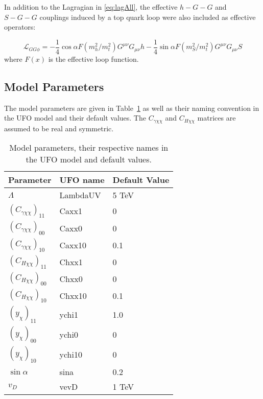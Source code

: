 \documentclass[a4paper,11pt]{article}
\begin{document}
In addition to the Lagragian in \cref{eq:lagAll}, the effective $h-G-G$ and $S-G-G$ couplings induced by a top quark loop were also included as effective operators:

\begin{equation*}
	\mathcal{L}_{GG\phi} = -\frac{1}{4} \cos\alpha F(m_h^2/m_t^2) G^{\mu\nu} G_{\mu\nu} h -\frac{1}{4} \sin\alpha F(m_S^2/m_t^2) G^{\mu\nu} G_{\mu\nu} S
\end{equation*}
where $F(x)$ is the effective loop function.
\subsection*{Model Parameters}

The model parameters are given in Table~\cref{tab:parameters} as well as their naming convention in the UFO model and their default values. The $C_{\gamma \chi\chi}$ and $C_{H \chi\chi}$ matrices are assumed to be real and symmetric.


\begin{table}[h!]   \centering
	\vspace{0.2cm}
	\caption{Model parameters, their respective names in the UFO model and default values.\label{tab:parameters}}
	\begin{tabular}{p{2cm}|p{4.5cm}|p{4.5cm}}
		\toprule
		\textbf{Parameter} & \textbf{UFO name} & \textbf{Default Value}\\ \toprule 
		$\Lambda$  & LambdaUV & 5 TeV\\
		$(C_{\gamma \chi\chi})_{11}$  & Caxx1 & 0\\
		$(C_{\gamma \chi\chi})_{00}$  & Caxx0 & 0\\
		$(C_{\gamma \chi\chi})_{10}$  & Caxx10 & 0.1\\
		$(C_{H \chi\chi})_{11}$  & Chxx1 & 0\\
		$(C_{H \chi\chi})_{00}$  & Chxx0 & 0\\
		$(C_{H \chi\chi})_{10}$  & Chxx10 & 0.1\\
		$(y_\chi)_{11}$  & ychi1 & 1.0\\
		$(y_\chi)_{00}$  & ychi0 & 0\\
		$(y_\chi)_{10}$  & ychi10 & 0\\
		$\sin\alpha$  & sina & 0.2\\
		$v_D$  & vevD & 1 TeV\\
		\bottomrule        
	\end{tabular}
\end{table}
\end{document}
